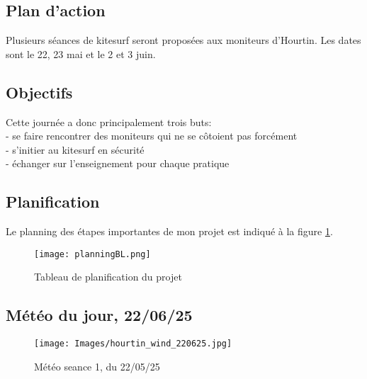 \documentclass[12pt,a4paper]{report}
\begin{document}
\subsection{Plan d'action}
Plusieurs séances de kitesurf seront proposées aux moniteurs d'Hourtin.
Les dates sont le 22, 23 mai et le 2 et 3 juin.
\subsection{Objectifs}
Cette journée a donc principalement trois buts:\\
- se faire rencontrer des moniteurs qui ne se côtoient pas forcément \\
- s'initier au kitesurf en sécurité \\
- échanger sur l'enseignement pour chaque pratique \\

\subsection{Planification}
Le planning des étapes importantes de mon projet est indiqué
à la figure \ref{gantt}.

\begin{figure}
\centering
\texttt{[image: planningBL.png]} 
\caption{Tableau de planification du projet \label{gantt}}
\end{figure}
\subsection{Météo du jour, 22/06/25}
\begin{figure}
\texttt{[image: Images/hourtin\_wind\_220625.jpg]} 
\caption{Météo seance 1, du 22/05/25}
\end{figure}
\end{document}
